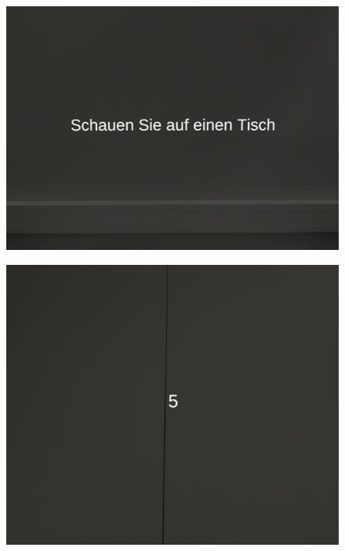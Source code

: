 \begin{figure}[H]
    \centering
    \begin{minipage}[b]{0.30\textwidth}
        \centering
        \includegraphics[width=\textwidth]{images/schritteins.png}
        \label{fig:eins}
    \end{minipage}
    \hfill
    \begin{minipage}[b]{0.30\textwidth}
        \centering
        \includegraphics[width=\textwidth]{images/schrittzwei.png}
        \label{fig:zwei}
        \end{minipage}
    \hfill
    \begin{minipage}[b]{0.30\textwidth}

\end{minipage}
\end{figure}
